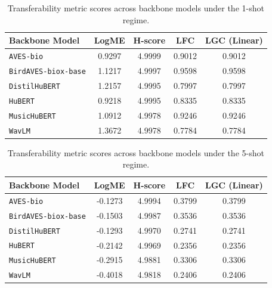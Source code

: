 \begin{table}[htbp]
\centering
\caption{Transferability metric scores across backbone models under the 1-shot regime.}
\label{tab:transferability_1_shot}
\begin{tabular}{lcccc}
\hline
\textbf{Backbone Model} & \textbf{LogME} & \textbf{H-score} & \textbf{LFC} & \textbf{LGC (Linear)} \\ \hline
\texttt{AVES-bio} & 0.9297 & 4.9999 & 0.9012 & 0.9012 \\
\texttt{BirdAVES-biox-base} & 1.1217 & 4.9997 & 0.9598 & 0.9598 \\
\texttt{DistilHuBERT} & 1.2157 & 4.9995 & 0.7997 & 0.7997 \\
\texttt{HuBERT} & 0.9218 & 4.9995 & 0.8335 & 0.8335 \\
\texttt{MusicHuBERT} & 1.0912 & 4.9978 & 0.9246 & 0.9246 \\
\texttt{WavLM} & 1.3672 & 4.9978 & 0.7784 & 0.7784 \\
\hline
\end{tabular}
\end{table}


\begin{table}[htbp]
\centering
\caption{Transferability metric scores across backbone models under the 5-shot regime.}
\label{tab:transferability_5_shot}
\begin{tabular}{lcccc}
\hline
\textbf{Backbone Model} & \textbf{LogME} & \textbf{H-score} & \textbf{LFC} & \textbf{LGC (Linear)} \\ \hline
\texttt{AVES-bio} & -0.1273 & 4.9994 & 0.3799 & 0.3799 \\
\texttt{BirdAVES-biox-base} & -0.1503 & 4.9987 & 0.3536 & 0.3536 \\
\texttt{DistilHuBERT} & -0.1293 & 4.9970 & 0.2741 & 0.2741 \\
\texttt{HuBERT} & -0.2142 & 4.9969 & 0.2356 & 0.2356 \\
\texttt{MusicHuBERT} & -0.2915 & 4.9881 & 0.3306 & 0.3306 \\
\texttt{WavLM} & -0.4018 & 4.9818 & 0.2406 & 0.2406 \\
\hline
\end{tabular}
\end{table}


